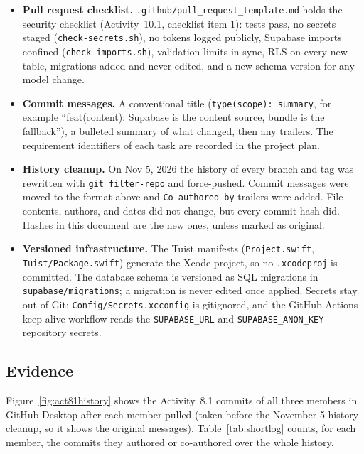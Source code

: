 \documentclass[12pt,letterpaper]{article}
\begin{document}
\begin{itemize}
        code, and \texttt{v1.0.0} marks the public 1.0.0 release on GitHub (the same
        code, plus the MIT license and this report's last corrections).
  \item \textbf{Pull request checklist.} \texttt{.github/pull\_request\_template.md}
        holds the security checklist (Activity~10.1, checklist item 1): tests pass, no
        secrets staged (\texttt{check-secrets.sh}), no tokens logged publicly, Supabase
        imports confined (\texttt{check-imports.sh}), validation limits in sync, RLS on
        every new table, migrations added and never edited, and a new schema version
        for any model change.
  \item \textbf{Commit messages.} A conventional title (\texttt{type(scope): summary},
        for example ``feat(content): Supabase is the content source, bundle is the fallback''), a
        bulleted summary of what changed, then any trailers. The requirement identifiers
        of each task are recorded in the project plan.
  \item \textbf{History cleanup.} On Nov 5, 2026 the history of every branch and tag was
        rewritten with \texttt{git filter-repo} and force-pushed. Commit messages were
        moved to the format above and \texttt{Co-authored-by} trailers were added. File
        contents, authors, and dates did not change, but every commit hash did. Hashes
        in this document are the new ones, unless marked as original.
  \item \textbf{Versioned infrastructure.} The Tuist manifests (\texttt{Project.swift},
        \texttt{Tuist/Package.swift}) generate the Xcode project, so no
        \texttt{.xcodeproj} is committed. The database schema is versioned as SQL
        migrations in \texttt{supabase/migrations}; a migration is never edited once
        applied. Secrets stay out of Git: \texttt{Config/Secrets.xcconfig} is
        gitignored, and the GitHub Actions keep-alive workflow reads the
        \texttt{SUPABASE\_URL} and \texttt{SUPABASE\_ANON\_KEY} repository secrets.
\end{itemize}

\subsection{Evidence}
Figure~\ref{fig:act81history} shows the Activity~8.1 commits of all three members in
GitHub Desktop after each member pulled (taken before the November 5 history cleanup,
so it shows the original messages). Table~\ref{tab:shortlog} counts, for each member,
the commits they authored or co-authored over the whole history.
\end{document}

